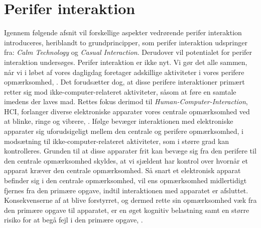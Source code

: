 \section{Perifer interaktion}
\label{PeriferInteratkion}
%
Igennem følgende afsnit vil forskellige aspekter vedrørende perifer interaktion introduceres, heriblandt to grundprincipper, som perifer interaktion udspringer fra: \textit{Calm Technology} og \textit{Casual Interaction}. Derudover vil potentialet for perifer interaktion undersøges.\blankline
%
Perifer interaktion er ikke nyt. Vi gør det alle sammen, når vi i løbet af vores dagligdag foretager adskillige aktiviteter i vores perifere opmærksomhed, \parencite[s. 1]{PDF:PIIntroduction}. Det forudsætter dog, at disse perifere interaktioner primært retter sig mod ikke-computer-relateret aktiviteter, såsom at føre en samtale imedens der laves mad. Rettes fokus derimod til \textit{Human-Computer-Interaction}, HCI, forlanger diverse elektroniske apparater vores centrale opmærksomhed ved at blinke, ringe og vibrere, \parencite[s. 1]{PDF:PIIntroduction}. Ifølge \textcite[s. 3]{PDF:PIIntroduction} bevæger interaktionen med elektroniske apparater sig uforudsigeligt mellem den centrale og perifere opmærksomhed, i modsætning til ikke-computer-relateret aktiviteter, som i større grad kan kontrolleres. Grunden til at disse apparater frit kan bevæge sig fra den perifere til den centrale opmærksomhed skyldes, at vi sjældent har kontrol over hvornår et apparat kræver den centrale opmærksomhed. Så snart et elektronisk apparat befinder sig i den centrale opmærksomhed, vil ens opmærksomhed midlertidigt fjernes fra den primære opgave, indtil interaktionen med apparatet er afsluttet. Konsekvenserne af at blive forstyrret, og dermed rette sin opmærksomhed væk fra den primære opgave til apparatet, er en øget kognitiv belastning samt en større risiko for at begå fejl i den primære opgave, \parencite[ss. 188-189][s. 162]{PDF:PIDesktopComputingKap9, PDF:ComparingInputModalities}. 

